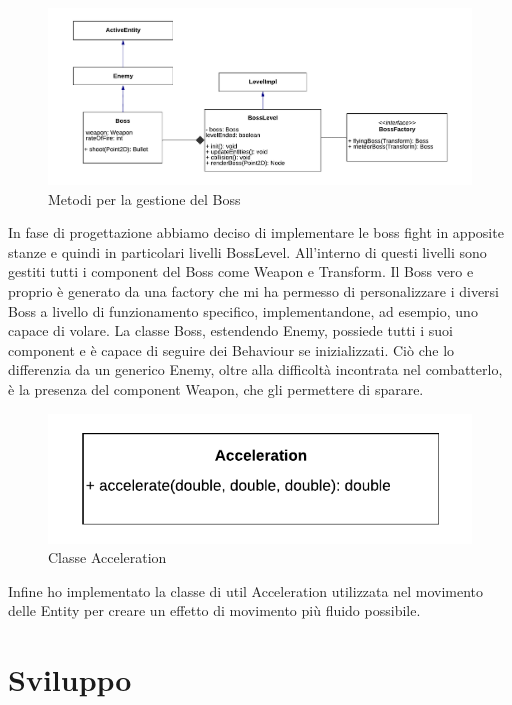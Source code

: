 \documentclass{article}
\begin{document}
\begin{figure}[ht]
\includegraphics[width=1\textwidth]{images/UMLBoss.png}
\caption{Metodi per la gestione del Boss}
\label{fig:boss}
\end{figure}

In fase di progettazione abbiamo deciso di implementare le boss fight in apposite stanze e quindi in particolari livelli BossLevel. All’interno di questi livelli sono gestiti tutti i component del Boss come Weapon e Transform.
Il Boss vero e proprio è generato da una factory che mi ha permesso di personalizzare i diversi Boss a livello di funzionamento specifico, implementandone, ad esempio, uno capace di volare.
La classe Boss, estendendo Enemy, possiede tutti i suoi component e è capace di seguire dei Behaviour se inizializzati. Ciò che lo differenzia da un generico Enemy, oltre alla difficoltà incontrata nel combatterlo, è la presenza del component Weapon, che gli permettere di sparare.

\begin{figure}[ht]
\includegraphics[width=1\textwidth]{images/UMLAcceleration.png}
\caption{Classe Acceleration}
\label{fig:acceleration}
\end{figure}

Infine ho implementato la classe di util Acceleration utilizzata nel movimento delle Entity per creare un effetto di movimento più fluido possibile.

\newpage
\section{Sviluppo}
\end{document}
